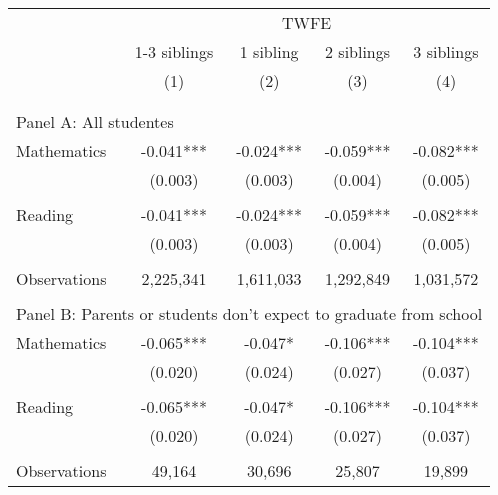 \makeatletter
{}
{
\makeatother
\begin{tabular}{lcccc}
\toprule
\cmidrule(lr){2-5}
& \multicolumn{4}{c}{TWFE} \\
\cmidrule(lr){2-5}
& 1-3 siblings & 1 sibling & 2 siblings & 3 siblings  \\
\cmidrule(lr){2-2} \cmidrule(lr){3-3} \cmidrule(lr){4-4} \cmidrule(lr){5-5}
& (1) & (2) & (3) & (4) \\
\bottomrule
&  &  & &  \\
&  &  & &  \\
\multicolumn{5}{l}{Panel A: All studentes } \\
Mathematics         &      -0.041***&      -0.024***&      -0.059***&      -0.082***\\
                    &     (0.003)   &     (0.003)   &     (0.004)   &     (0.005)   \\
 
&  &  & &  \\
Reading             &      -0.041***&      -0.024***&      -0.059***&      -0.082***\\
                    &     (0.003)   &     (0.003)   &     (0.004)   &     (0.005)   \\
                    &               &               &               &               \\
Observations        &   2,225,341   &   1,611,033   &   1,292,849   &   1,031,572   \\
 
&  &  & &  \\
\multicolumn{5}{l}{Panel B: Parents or students don't expect to graduate from school} \\
Mathematics         &      -0.065***&      -0.047*  &      -0.106***&      -0.104***\\
                    &     (0.020)   &     (0.024)   &     (0.027)   &     (0.037)   \\
 
&  &  & &  \\
Reading             &      -0.065***&      -0.047*  &      -0.106***&      -0.104***\\
                    &     (0.020)   &     (0.024)   &     (0.027)   &     (0.037)   \\
                    &               &               &               &               \\
Observations        &      49,164   &      30,696   &      25,807   &      19,899   \\
 

\end{tabular}}
